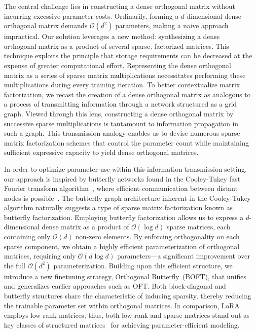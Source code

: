 The central challenge lies in constructing a dense orthogonal matrix without incurring excessive parameter costs. Ordinarily, forming a $d$-dimensional dense orthogonal matrix demands $\mathcal{O}(d^2)$ parameters, making a naive approach impractical. Our solution leverages a new method: synthesizing a dense orthogonal matrix as a product of several sparse, factorized matrices. This technique exploits the principle that storage requirements can be decreased at the expense of greater computational effort. Representing the dense orthogonal matrix as a series of sparse matrix multiplications necessitates performing these multiplications during every training iteration. To better contextualize matrix factorization, we recast the creation of a dense orthogonal matrix as analogous to a process of transmitting information through a network structured as a grid graph. Viewed through this lens, constructing a dense orthogonal matrix by successive sparse multiplications is tantamount to information propagation in such a graph. This transmission analogy enables us to devise numerous sparse matrix factorization schemes that control the parameter count while maintaining sufficient expressive capacity to yield dense orthogonal matrices.

In order to optimize parameter use within this information transmission setting, our approach is inspired by butterfly networks found in the Cooley-Tukey fast Fourier transform algorithm~\cite{cooley1965algorithm}, where efficient communication between distant nodes is possible~\cite{klasing1994broadcasting}. The butterfly graph architecture inherent in the Cooley-Tukey algorithm naturally suggests a type of sparse matrix factorization known as butterfly factorization. Employing butterfly factorization allows us to express a $d$-dimensional dense matrix as a product of $\mathcal{O}(\log d)$ sparse matrices, each containing only $\mathcal{O}(d)$ non-zero elements. By enforcing orthogonality on each sparse component, we obtain a highly efficient parameterization of orthogonal matrices, requiring only $\mathcal{O}(d \log d)$ parameters—a significant improvement over the full $\mathcal{O}(d^2)$ parameterization. Building upon this efficient structure, we introduce a new finetuning strategy, Orthogonal Butterfly~(BOFT), that unifies and generalizes earlier approaches such as OFT. Both block-diagonal and butterfly structures share the characteristic of inducing sparsity, thereby reducing the trainable parameter set within orthogonal matrices. In comparison, LoRA~\cite{hulora2022} employs low-rank matrices; thus, both low-rank and sparse matrices stand out as key classes of structured matrices~\cite{candes2011robust} for achieving parameter-efficient modeling.

